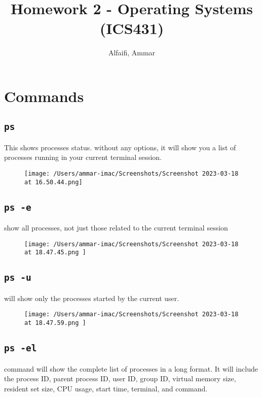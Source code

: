 \documentclass{article}
\title{Homework 2 - Operating Systems (ICS431)}
\author{Alfaifi, Ammar}
\date{}
\def\c#1{\texttt{#1}}
\begin{document}
\maketitle

\section{Commands}%
\subsection{\c{ps}}%

This shows processes status. without any options, it will show you a list of processes
running in your current terminal session.

\begin{figure}[ht]
	\centering
	\texttt{[image: /Users/ammar-imac/Screenshots/Screenshot 2023-03-18 at 16.50.44.png]}
\end{figure}


\subsection{\c{ps -e}}%

show all processes, not just those related to the current terminal session

\begin{figure}[ht]
	\centering
	\texttt{[image: /Users/ammar-imac/Screenshots/Screenshot 2023-03-18 at 18.47.45.png ]}
\end{figure}


\subsection{\c{ps -u}}%

will show only the processes started by the current user.

\begin{figure}[ht]
	\centering
	\texttt{[image: /Users/ammar-imac/Screenshots/Screenshot 2023-03-18 at 18.47.59.png ]}
\end{figure}

\newpage

\subsection{\c{ps -el}}%
command will show the complete list of processes in a long format. It will include the process ID, parent process ID, user ID, group ID, virtual memory size, resident set size, CPU usage, start time, terminal, and command.
\end{document}
